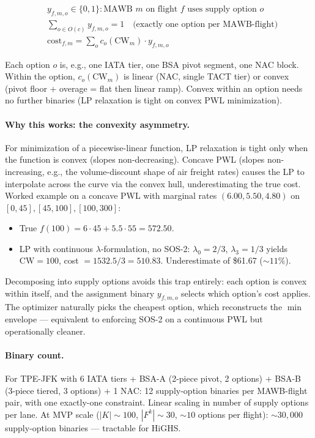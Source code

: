 \documentclass[11pt,a4paper]{article}
\theoremstyle{definition}
\begin{document}
\begin{equation}
  \begin{aligned}
    & y_{f,m,o} \in \{0, 1\}: \text{MAWB } m \text{ on flight } f \text{ uses supply option } o \\
    & \sum_{o \in O(c)} y_{f,m,o} = 1 \quad \text{(exactly one option per MAWB-flight)} \\
    & \text{cost}_{f,m} = \sum_{o} c_o(\text{CW}_m) \cdot y_{f,m,o}
  \end{aligned}
\end{equation}

Each option \(o\) is, e.g., one IATA tier, one BSA pivot segment, one NAC block.
Within the option, \(c_o(\text{CW}_m)\) is linear (NAC, single TACT tier) or convex
(pivot floor + overage = flat then linear ramp). Convex within an option needs no
further binaries (LP relaxation is tight on convex PWL minimization).

\paragraph{Why this works: the convexity asymmetry.}
For minimization of a piecewise-linear function, LP relaxation is tight only when
the function is convex (slopes non-decreasing). Concave PWL (slopes non-increasing,
e.g., the volume-discount shape of air freight rates) causes the LP to interpolate
across the curve via the convex hull, underestimating the true cost. Worked example
on a concave PWL with marginal rates \((6.00, 5.50, 4.80)\) on \([0,45], [45,100],
[100, 300]\):

\begin{itemize}[noitemsep]
  \item True \(f(100) = 6 \cdot 45 + 5.5 \cdot 55 = 572.50\).
  \item LP with continuous \(\lambda\)-formulation, no SOS-2: \(\lambda_0 = 2/3\),
        \(\lambda_3 = 1/3\) yields \(\text{CW} = 100\), cost \(= 1532.5/3 = 510.83\).
        Underestimate of \$61.67 ($\sim 11\%$).
\end{itemize}

Decomposing into supply options avoids this trap entirely: each option is convex
within itself, and the assignment binary \(y_{f,m,o}\) selects which option's
cost applies. The optimizer naturally picks the cheapest option, which reconstructs
the \(\min\) envelope — equivalent to enforcing SOS-2 on a continuous PWL but
operationally cleaner.

\paragraph{Binary count.}
For TPE-JFK with 6 IATA tiers + BSA-A (2-piece pivot, 2 options) + BSA-B (3-piece
tiered, 3 options) + 1 NAC: 12 supply-option binaries per MAWB-flight pair, with
one exactly-one constraint. Linear scaling in number of supply options per lane.
At MVP scale (\(|K| \sim 100\), \(|F^k| \sim 30\), \(\sim 10\) options per flight):
\(\sim 30{,}000\) supply-option binaries — tractable for HiGHS.
\end{document}
